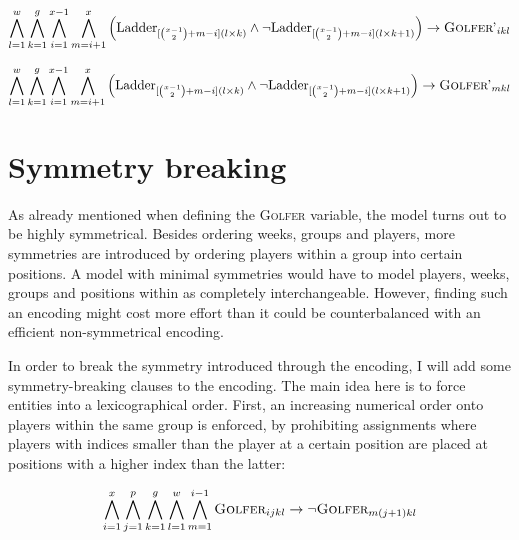 \documentclass[a4paper]{scrartcl}
\begin{document}
\begin{equation}
\centering
    \bigwedge \limits_{l=1}^{w}
    \bigwedge \limits_{k=1}^{g}
    \bigwedge \limits_{i=1}^{x-1}
    \bigwedge \limits_{m=i+1}^{x}
    \Big(
        \text{Ladder}_{
            [
                {x-1 \choose 2}
                +m-i
            ](l \times k)
        }
        \wedge
        \neg
        \text{Ladder}_{
            [
                {x-1 \choose 2}
                +m-i
            ](l \times k + 1)
        }
    \Big)
    \to
    \textsc{Golfer'}_{ikl}
\end{equation}

\begin{equation}
\centering
    \bigwedge \limits_{l=1}^{w}
    \bigwedge \limits_{k=1}^{g}
    \bigwedge \limits_{i=1}^{x-1}
    \bigwedge \limits_{m=i+1}^{x}
    \Big(
        \text{Ladder}_{
            [
                {x-1 \choose 2}
                +m-i
            ](l \times k)
        }
        \wedge
        \neg
        \text{Ladder}_{
            [
                {x-1 \choose 2}
                +m-i
            ](l \times k + 1)
        }
    \Big)
    \to
    \textsc{Golfer'}_{mkl}
\end{equation}

\section{Symmetry breaking}

As already mentioned when defining the \textsc{Golfer} variable, the model turns out to be highly symmetrical. Besides ordering weeks, groups and players, more symmetries are introduced by ordering players within a group into certain positions. A model with minimal symmetries would have to model players, weeks, groups and positions within as completely interchangeable. However, finding such an encoding might cost more effort than it could be counterbalanced with an efficient non-symmetrical encoding. 

In order to break the symmetry introduced through the encoding, I will add some symmetry-breaking clauses to the encoding. The main idea here is to force entities into a lexicographical order. First, an increasing numerical order onto players within the same group is enforced, by prohibiting assignments where players with indices smaller than the player at a certain position are placed at positions with a higher index than the latter:

\begin{equation}
\centering
    \bigwedge \limits_{i=1}^x
    \bigwedge \limits_{j=1}^p
    \bigwedge \limits_{k=1}^g
    \bigwedge \limits_{l=1}^w
    \bigwedge \limits_{m=1}^{i-1}
    \textsc{Golfer}_{ijkl}
    \to
    \neg \textsc{Golfer}_{m(j+1)kl}
\end{equation}
\end{document}
